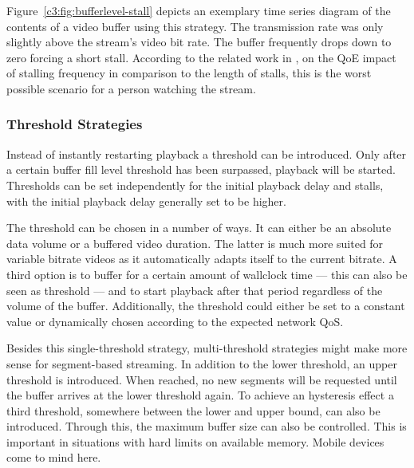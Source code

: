Figure~\ref{c3:fig:bufferlevel-stall} depicts an exemplary time series diagram of the contents of a video buffer using this strategy. The transmission rate was only slightly above the stream's video bit rate. The buffer frequently drops down to zero forcing a short stall. According to the related work in \cite{6123395}, on the \gls{QoE} impact of stalling frequency in comparison to the length of stalls, this is the worst possible scenario for a person watching the stream.


\subsubsection{Threshold Strategies}

Instead of instantly restarting playback a threshold can be introduced. Only after a certain buffer fill level threshold has been surpassed, playback will be started. Thresholds can be set independently for the initial playback delay and stalls, with the initial playback delay generally set to be higher.

The threshold can be chosen in a number of ways. It can either be an absolute data volume or a buffered video duration. The latter is much more suited for variable bitrate videos as it automatically adapts itself to the current bitrate. A third option is to buffer for a certain amount of wallclock time --- this can also be seen as threshold --- and to start playback after that period regardless of the volume of the buffer. Additionally, the threshold could either be set to a constant value or dynamically chosen according to the expected network \gls{QoS}.

Besides this single-threshold strategy, multi-threshold strategies might make more sense for segment-based streaming. In addition to the lower threshold, an upper threshold is introduced. When reached, no new segments will be requested until the buffer arrives at the lower threshold again. To achieve an hysteresis effect a third threshold, somewhere between the lower and upper bound, can also be introduced. Through this, the maximum buffer size can also be controlled. This is important in situations with hard limits on available memory. Mobile devices come to mind here.



